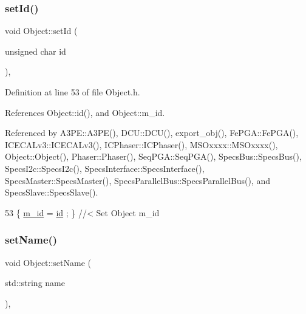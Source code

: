 \subsubsection{\texorpdfstring{set\+Id()}{setId()}}
{\footnotesize\ttfamily void Object\+::set\+Id (\begin{DoxyParamCaption}\item[{unsigned char}]{id }\end{DoxyParamCaption})\hspace{0.3cm}{\ttfamily [inline]}, {\ttfamily [inherited]}}



Definition at line 53 of file Object.\+h.



References Object\+::id(), and Object\+::m\+\_\+id.



Referenced by A3\+P\+E\+::\+A3\+P\+E(), D\+C\+U\+::\+D\+C\+U(), export\+\_\+obj(), Fe\+P\+G\+A\+::\+Fe\+P\+G\+A(), I\+C\+E\+C\+A\+Lv3\+::\+I\+C\+E\+C\+A\+Lv3(), I\+C\+Phaser\+::\+I\+C\+Phaser(), M\+S\+Oxxxx\+::\+M\+S\+Oxxxx(), Object\+::\+Object(), Phaser\+::\+Phaser(), Seq\+P\+G\+A\+::\+Seq\+P\+G\+A(), Specs\+Bus\+::\+Specs\+Bus(), Specs\+I2c\+::\+Specs\+I2c(), Specs\+Interface\+::\+Specs\+Interface(), Specs\+Master\+::\+Specs\+Master(), Specs\+Parallel\+Bus\+::\+Specs\+Parallel\+Bus(), and Specs\+Slave\+::\+Specs\+Slave().


\begin{DoxyCode}
53 \{ \hyperlink{classObject_aca74b9dbfed7b5556ea2d56c65b6b6b0}{m\_id}    = \hyperlink{classObject_af99145335cc61ff6e2798ea17db009d2}{id}    ; \} \textcolor{comment}{//< Set Object m\_id}
\end{DoxyCode}
\mbox{\label{classObject_ae30fea75683c2d149b6b6d17c09ecd0c}} 
\subsubsection{\texorpdfstring{set\+Name()}{setName()}}
{\footnotesize\ttfamily void Object\+::set\+Name (\begin{DoxyParamCaption}\item[{std\+::string}]{name }\end{DoxyParamCaption})\hspace{0.3cm}{\ttfamily [inline]}, {\ttfamily [inherited]}}



